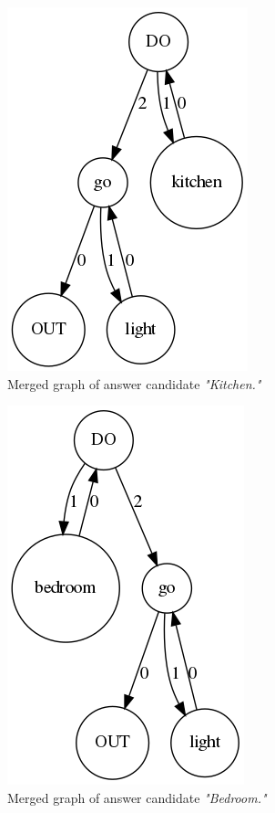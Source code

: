 \begin{figure}
	\centering
	\includegraphics[scale=0.4]{figures/comp}
	\caption{Merged graph of answer candidate \textit{"Kitchen."}}
	\label{fig:merge1}
\end{figure}

\begin{figure}
	\centering
	\includegraphics[scale=0.4]{figures/comp2}
	\caption{Merged graph of answer candidate \textit{"Bedroom."}}
	\label{fig:merge2}
\end{figure}

